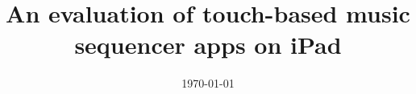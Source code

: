 \documentclass[a4paper, 11pt, oneside]{Thesis}  %
\begin{document}
\frontmatter      %

\title  {An evaluation of touch-based music sequencer apps on iPad}
\addresses  {\groupname\\\deptname\\\univname}  %
\date       {\today}
\keywords   {}

\maketitle


\fancyhead{}  %
\rhead{\thepage}  %
\lhead{}  %

\pagestyle{fancy}  %
\end{document}
